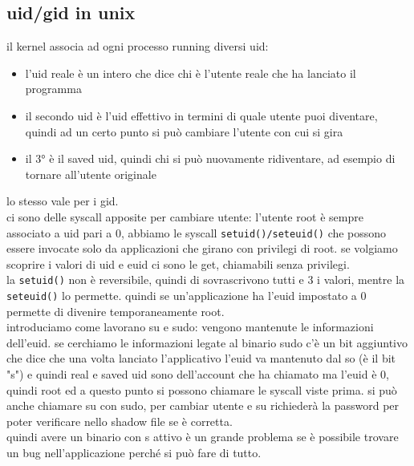 \documentclass[12pt, oneside]{extbook} %
\begin{document}
\subsection{uid/gid in unix}
il kernel associa ad ogni processo running diversi uid:
\begin{itemize}
\item l'uid reale è un intero che dice chi è l'utente reale che ha lanciato il programma
\item il secondo uid è l'uid effettivo in termini di quale utente puoi diventare, quindi ad un certo punto si può cambiare l'utente con cui si gira
\item il 3° è il saved uid, quindi chi si può nuovamente ridiventare, ad esempio di tornare all'utente originale
\end{itemize}
lo stesso vale per i gid.\\ ci sono delle syscall apposite per cambiare utente: l'utente root è sempre associato a uid pari a 0, abbiamo le syscall \texttt{setuid()/seteuid()} che possono essere invocate solo da applicazioni che girano con privilegi di root. se volgiamo scoprire i valori di uid e euid ci sono le get, chiamabili senza privilegi.\\ la \texttt{setuid()} non è reversibile, quindi di sovrascrivono tutti e 3 i valori, mentre la \texttt{seteuid()} lo permette. quindi se un'applicazione ha l'euid impostato a 0 permette di divenire temporaneamente root.\\introduciamo come lavorano su e sudo: vengono mantenute le informazioni dell'euid. se cerchiamo le informazioni legate al binario sudo c'è un bit aggiuntivo che dice che una volta lanciato l'applicativo l'euid va mantenuto dal so (è il bit "s") e quindi real e saved uid sono dell'account che ha chiamato ma l'euid è 0, quindi root ed a questo punto si possono chiamare le syscall viste prima. si può anche chiamare su con sudo, per cambiar utente e su richiederà la password per poter verificare nello shadow file se è corretta.\\quindi avere un binario con s attivo è un grande problema se è possibile trovare un bug nell'applicazione perché si può fare di tutto.
\end{document}
